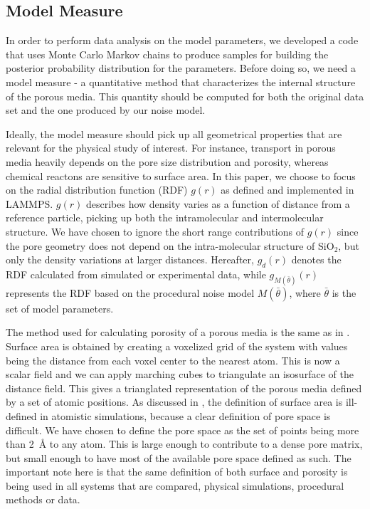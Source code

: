 \documentclass[aps,pre,twocolumn,letterpaper,floatfix,showpacs]{revtex4}
\begin{document}
\subsection{Model Measure}
In order to perform data analysis on the model parameters, we developed a code that
uses Monte Carlo Markov chains to produce samples for building the posterior probability distribution for the parameters. 
Before doing so, we need a model measure - a quantitative method that characterizes
the internal structure of the porous media. This quantity should be computed for both
the original data set and the one produced by our noise model. 

Ideally, the model measure should pick up all geometrical properties that are
relevant for the physical study of interest. 
For instance, transport in porous media heavily depends on the pore size distribution and porosity\cite{kozeny1927uber, carman1937fluid},
whereas chemical reactons are sensitive to surface area\cite{coussy2011mechanics}.
In this paper, we choose to focus on the radial distribution function (RDF)
$g(r)$ as defined and implemented in LAMMPS\cite{plimpton1995fast}.
$g(r)$ describes how density varies as a function of distance from a 
reference particle, picking up both the intramolecular and intermolecular structure. 
We have chosen to ignore the short range contributions of $g(r)$ since
the pore geometry does not depend on the intra-molecular structure of
SiO$_2$, but only the density variations at larger distances. 
Hereafter, $g_d(r)$ denotes the RDF calculated from simulated or experimental data,
while $g_{M(\bar \theta)}(r)$ represents the RDF based on the procedural noise
model $M(\bar \theta)$, where $\bar \theta$ is the set of model parameters. 

The method used for calculating porosity of a porous media is the same as in \cite{gelb1998characterization}.
Surface area is obtained by creating a voxelized grid of the system with values being the distance from each voxel center to the nearest atom.
This is now a scalar field and we can apply marching cubes to triangulate an isosurface of the distance field.
This gives a trianglated representation of the porous media defined by a set of atomic positions.
As discussed in \cite{gelb1998characterization}, the definition of surface area is ill-defined in
atomistic simulations, because a clear definition of pore space is difficult.
We have chosen to define the pore space as the set of points being more than \SI{2}{\angstrom} to any atom.
This is large enough to contribute to a dense pore matrix, but small enough to have most of the available pore space defined as such. 
The important note here is that the same definition of both surface and porosity is being used in all systems that are compared, physical simulations, procedural methods or data. 
\end{document}
